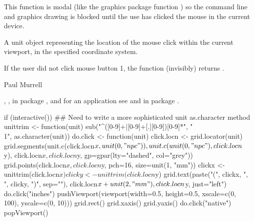 %
\begin{Details}\relax
This function is modal (like the graphics package
function ) so
the command line and graphics drawing is blocked until
the use has clicked the mouse  in the current device.
\end{Details}
%
\begin{Value}
A unit object representing the location of the mouse click within the
current viewport, in the specified coordinate system.

If the user did not click mouse button 1, the function
(invisibly) returns .
\end{Value}
%
\begin{Author}\relax
 Paul Murrell 
\end{Author}
%
\begin{SeeAlso}\relax
 , ,
 in package , and for an application
see  and
 in package
.
\end{SeeAlso}
%
\begin{Examples}
\begin{ExampleCode}
if (interactive()) {
  ## Need to write a more sophisticated unit as.character method
  unittrim <- function(unit) {
    sub("^([0-9]+|[0-9]+[.][0-9])[0-9]*", "\\1", as.character(unit))
  }
  do.click <- function(unit) {
    click.locn <- grid.locator(unit)
    grid.segments(unit.c(click.locn$x, unit(0, "npc")),
                  unit.c(unit(0, "npc"), click.locn$y),
                  click.locn$x, click.locn$y,
                  gp=gpar(lty="dashed", col="grey"))
    grid.points(click.locn$x, click.locn$y, pch=16, size=unit(1, "mm"))
    clickx <- unittrim(click.locn$x)
    clicky <- unittrim(click.locn$y)
    grid.text(paste("(", clickx, ", ", clicky, ")", sep=""),
              click.locn$x + unit(2, "mm"), click.locn$y,
              just="left")
  }
  do.click("inches")
  pushViewport(viewport(width=0.5, height=0.5,
                         xscale=c(0, 100), yscale=c(0, 10)))
  grid.rect()
  grid.xaxis()
  grid.yaxis()
  do.click("native")
  popViewport()  
}
\end{ExampleCode}
\end{Examples}

